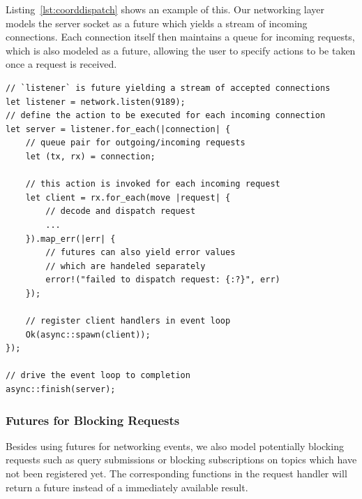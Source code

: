 Listing~\ref{lst:coorddispatch} shows an example of this. Our networking layer
models the server socket as a future which yields a stream of incoming connections.
Each connection itself then maintains a queue for incoming requests, which is
also modeled as a future, allowing the user to specify actions to be taken
once a request is received.

\begin{lstlisting}[caption={[Connection handling at the coordinator]%
Accepting and dispatching incoming connections. The actions specified
in \lstinline{for_each} and \lstinline{map_err} are invoked by the
event loop if the corresponding events (such as new incoming connections,
new incoming requests or errors during request handling) occur.},label={lst:coorddispatch}]
// `listener` is future yielding a stream of accepted connections
let listener = network.listen(9189);
// define the action to be executed for each incoming connection
let server = listener.for_each(|connection| {
    // queue pair for outgoing/incoming requests
    let (tx, rx) = connection;
   
    // this action is invoked for each incoming request
    let client = rx.for_each(move |request| {
        // decode and dispatch request 
        ...
    }).map_err(|err| {
        // futures can also yield error values
        // which are handeled separately
        error!("failed to dispatch request: {:?}", err)
    });

    // register client handlers in event loop
    Ok(async::spawn(client));
});

// drive the event loop to completion
async::finish(server);
\end{lstlisting}

\subsubsection{Futures for Blocking Requests}

Besides using futures for networking events, we also model potentially
blocking requests such as query submissions or blocking subscriptions on
topics which have not been registered yet. The corresponding functions in the
request handler will return a future instead of a immediately available
result. 


